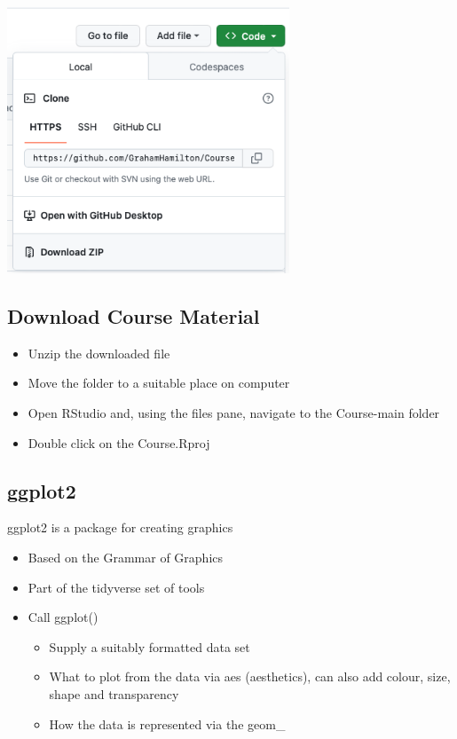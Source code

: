 \documentclass[
  letterpaper,
  DIV=11,
  numbers=noendperiod,
  landscape]{scrartcl}
\providecommand{\tightlist}{%
  \setlength{\itemsep}{0pt}\setlength{\parskip}{0pt}}\usepackage{longtable,booktabs,array}
\begin{document}
\includegraphics[width=\textwidth,height=3.125in]{images/Github_download.png}

\hypertarget{download-course-material-1}{%
\subsection{Download Course Material}\label{download-course-material-1}}

\begin{itemize}
\tightlist
\item
  Unzip the downloaded file
\item
  Move the folder to a suitable place on computer
\item
  Open RStudio and, using the files pane, navigate to the Course-main
  folder
\item
  Double click on the Course.Rproj
\end{itemize}

\hypertarget{ggplot2}{%
\subsection{ggplot2}\label{ggplot2}}

ggplot2 is a package for creating graphics

\begin{itemize}
\tightlist
\item
  Based on the Grammar of Graphics\\
\item
  Part of the tidyverse set of tools
\item
  Call ggplot()

  \begin{itemize}
  \tightlist
  \item
    Supply a suitably formatted data set\\
  \item
    What to plot from the data via aes (aesthetics), can also add
    colour, size, shape and transparency\\
  \item
    How the data is represented via the geom\_
  \end{itemize}
\end{itemize}
\end{document}

